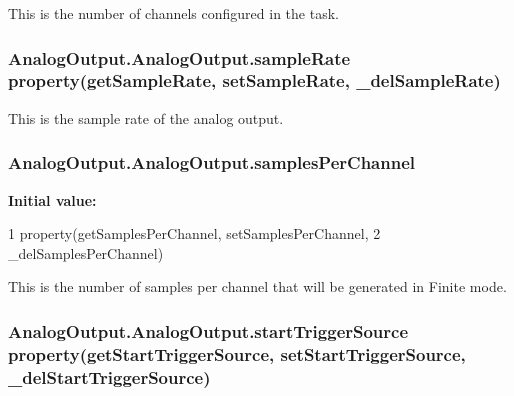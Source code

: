 This is the number of channels configured in the task. 

\hypertarget{class_analog_output_1_1_analog_output_a493b9db1346a6d9cceae925ad85a3fef}{
\subsubsection[{sample\-Rate}]{\setlength{\rightskip}{0pt plus 5cm}Analog\-Output.\-Analog\-Output.\-sample\-Rate property({\bf get\-Sample\-Rate}, {\bf set\-Sample\-Rate}, \-\_\-del\-Sample\-Rate)\hspace{0.3cm}{\ttfamily [static]}}}\label{class_analog_output_1_1_analog_output_a493b9db1346a6d9cceae925ad85a3fef}


This is the sample rate of the analog output. 

\hypertarget{class_analog_output_1_1_analog_output_a3b52a2dd204f53dd5e5573011c1399e8}{
\subsubsection[{samples\-Per\-Channel}]{\setlength{\rightskip}{0pt plus 5cm}Analog\-Output.\-Analog\-Output.\-samples\-Per\-Channel\hspace{0.3cm}{\ttfamily [static]}}}\label{class_analog_output_1_1_analog_output_a3b52a2dd204f53dd5e5573011c1399e8}
{\bfseries Initial value\-:}
\begin{DoxyCode}
1 property(getSamplesPerChannel, setSamplesPerChannel,
2             \_delSamplesPerChannel)
\end{DoxyCode}


This is the number of samples per channel that will be generated in Finite mode. 

\hypertarget{class_analog_output_1_1_analog_output_a6fb285ae88ea470ec5a99f9163e36c88}{
\subsubsection[{start\-Trigger\-Source}]{\setlength{\rightskip}{0pt plus 5cm}Analog\-Output.\-Analog\-Output.\-start\-Trigger\-Source property({\bf get\-Start\-Trigger\-Source}, {\bf set\-Start\-Trigger\-Source}, \-\_\-del\-Start\-Trigger\-Source)\hspace{0.3cm}{\ttfamily [static]}}}\label{class_analog_output_1_1_analog_output_a6fb285ae88ea470ec5a99f9163e36c88}


